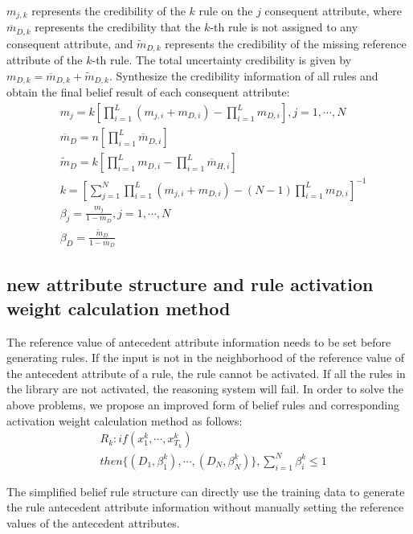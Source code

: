 \documentclass{ieeeaccess}
\begin{document}
$m_{j,k}$ represents the credibility of the $k$ rule on the $j$ consequent attribute,
where $\overline{m}_{D,k}$ represents the credibility that the $k$-th rule is not assigned to any consequent attribute,
and $\widetilde{m}_{D,k}$  represents the credibility of the missing reference attribute of the $k$-th rule.
The total uncertainty credibility is given by $m_{D,k}=\overline{m}_{D,k}+\widetilde{m}_{D,k}$.
Synthesize the credibility information of all rules and obtain the final belief result of each consequent attribute:
\begin{align}
     & m_j=k[\prod_{i=1}^L(m_{j,i}+m_{D,i})-\prod_{i=1}^Lm_{D,i}],j=1,\cdots,N       \\
     & \overline{m}_D=n[\prod_{i=1}^L\overline{m}_{D,i}]                             \\
     & \widetilde{m}_D=k[\prod_{i=1}^Lm_{D,i}-\prod_{i=1}^L\overline{m}_{H,i}]       \\
     & k=[\sum_{j=1}^N\prod_{i=1}^L(m_{j,i}+m_{D,i})-(N-1)\prod_{i=1}^Lm_{D,i}]^{-1} \\
     & \beta_j=\frac{m_j}{1-\overline{m}_D},j=1,\cdots,N                             \\
     & \beta_D=\frac{\widetilde{m}_D}{1-\overline{m}_D}
\end{align}

\subsection{new attribute structure and rule activation weight calculation method}
The reference value of antecedent attribute information needs to be set before generating rules.
If the input is not in the neighborhood of the reference value of the antecedent attribute of a rule, the rule cannot be activated.
If all the rules in the library are not activated, the reasoning system will fail.
In order to solve the above problems, we propose an improved form of belief rules and corresponding activation weight calculation method as follows:
\begin{equation}
    \begin{split}
        &R_k:if(x_1^k , \cdots , x_{T_k}^k)\\
        &then\{(D_1,\beta_1^k),\cdots,(D_N,\beta_N^k)\},\sum_{i=1}^N\beta_i^k\leq1
    \end{split}
\end{equation}

The simplified belief rule structure can directly use the training data to generate the rule antecedent attribute information without manually setting the reference values of the antecedent attributes.
\end{document}
